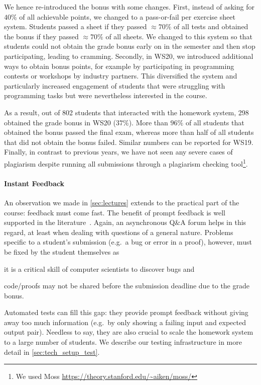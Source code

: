 We hence re-introduced the bonus with some changes.
First, instead of asking for $40\%$ of all achievable points,
we changed to a pass-or-fail per exercise sheet system.
Students passed a sheet if they
passed $\approx 70\%$ of all tests
and obtained the bonus if they passed $\approx 70\%$ of all sheets.
We changed to this system so that students
could not obtain the grade bonus early on in the semester and then stop participating,
leading to cramming.
Secondly, in WS20, we introduced additional ways to
obtain bonus points,
for example by participating in programming contests or workshops by industry partners.
This diversified the system and
particularly increased engagement of
students that were struggling
with programming tasks but were nevertheless interested in the course.

As a result, out of 802 students that interacted with the homework system,
298 obtained the grade bonus in WS20 ($37\%$).
More than $96\%$ of all students that obtained the bonus
passed the final exam,
whereas more than half of all students that did not obtain the bonus failed.
Similar numbers can be reported for WS19.
Finally, in contrast to previous years,
we have not seen any severe cases of plagiarism despite
running all submissions through a plagiarism checking tool\footnote{We used Moss \url{https://theory.stanford.edu/~aiken/moss/}}.

\paragraph{Instant Feedback}
An observation we made in \cref{sec:lectures}
extends to the practical part of the course:
feedback must come fast.
The benefit of prompt feedback is well supported in the literature~\cite{onlineengagement2,onlineengagement4}.
Again, an asynchronous Q\&A forum helps in this regard,
at least when dealing with questions of a general nature.
Problems specific to a student's submission (e.g.\ a bug or error in a proof),
however, must be fixed by the student themselves as
\begin{enumerate*}[label=\arabic*)]
  \item it is a critical skill of computer scientists to discover bugs and
  \item code/proofs may not be shared before the submission deadline due to the grade bonus.
\end{enumerate*}

Automated tests can fill this gap:
they provide prompt feedback without giving away too much information (e.g.\ by only showing a failing input and expected output pair).
Needless to say, they are also crucial to
scale the homework system to a large number of students.
We describe our testing infrastructure in more detail in \cref{sec:tech_setup_test}.


